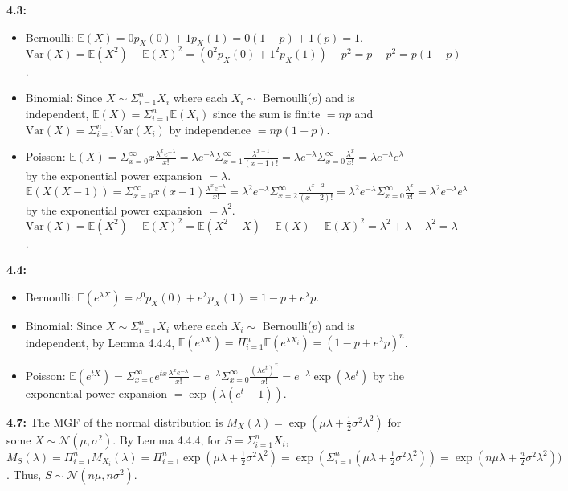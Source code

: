 \documentclass[12pt]{article}
\newcommand{\E}{\mathbb{E}}
\newcommand{\V}{\text{Var}}
\begin{document}
\textbf{4.3:}
\begin{itemize}
    \item Bernoulli: $\E(X) = 0p_X(0) + 1p_X(1) = 0(1 - p) + 1(p) = 1$. $\V(X) = \E(X^2) - \E(X)^2 = (0^2 p_X(0) + 1^2 p_X(1)) - p^2 = p - p^2 = p(1 - p)$.
    \item Binomial: Since $X \sim \Sigma_{i=1}^n X_i$ where each $X_i \sim$ Bernoulli($p$) and is independent, $\E(X) = \Sigma_{i=1}^n \E(X_i)$ since the sum is finite $= np$ and $\V(X) = \Sigma_{i=1}^n \V(X_i)$ by independence $= np(1 - p)$.
    \item Poisson: $\E(X) = \Sigma_{x=0}^\infty x\frac{\lambda^x e^{-\lambda}}{x!} = \lambda e^{-\lambda} \Sigma_{x=1}^\infty \frac{\lambda^{x-1}}{(x-1)!} = \lambda e^{-\lambda} \Sigma_{x=0}^\infty \frac{\lambda^x}{x!} = \lambda e^{-\lambda} e^{\lambda}$ by the exponential power expansion $= \lambda$. $\E(X(X-1)) = \Sigma_{x=0}^\infty x(x-1)\frac{\lambda^x e^{-\lambda}}{x!} = \lambda^2 e^{-\lambda} \Sigma_{x=2}^\infty \frac{\lambda^{x-2}}{(x-2)!} = \lambda^2 e^{-\lambda} \Sigma_{x=0}^\infty \frac{\lambda^x}{x!} = \lambda^2 e^{-\lambda} e^{\lambda}$ by the exponential power expansion $= \lambda^2$. $\V(X) = \E(X^2) - \E(X)^2 = \E(X^2 - X) + \E(X) - \E(X)^2 = \lambda^2 + \lambda - \lambda^2 = \lambda$.
\end{itemize}

\textbf{4.4:}
\begin{itemize}
    \item Bernoulli: $\E(e^{\lambda X}) = e^0 p_X(0) + e^\lambda p_X(1) = 1 - p + e^\lambda p$.
    \item Binomial: Since $X \sim \Sigma_{i=1}^n X_i$ where each $X_i \sim$ Bernoulli($p$) and is independent, by Lemma 4.4.4, $\E(e^{\lambda X}) = \Pi_{i=1}^n \E(e^{\lambda X_i}) = (1 - p + e^\lambda p)^n$.
    \item Poisson: $\E(e^{tX}) = \Sigma_{x=0}^\infty e^{tx} \frac{\lambda^x e^{-\lambda}}{x!} = e^{-\lambda} \Sigma_{x=0}^\infty \frac{(\lambda e^t)^x}{x!} = e^{-\lambda} \exp(\lambda e^t)$ by the exponential power expansion $= \exp(\lambda (e^t - 1))$.
\end{itemize}

\textbf{4.7:} The MGF of the normal distribution is $M_{X}(\lambda) = \exp(\mu\lambda + \frac{1}{2}\sigma^2\lambda^2)$ for some $X \sim \mathcal{N}(\mu, \sigma^2)$. By Lemma 4.4.4, for $S = \Sigma_{i=1}^n X_i$, $M_S(\lambda) = \Pi_{i=1}^n M_{X_i}(\lambda) = \Pi_{i=1}^n \exp(\mu\lambda + \frac{1}{2}\sigma^2\lambda^2) = \exp(\Sigma_{i=1}^n (\mu\lambda + \frac{1}{2}\sigma^2\lambda^2)) = \exp(n\mu\lambda + \frac{n}{2}\sigma^2\lambda^2))$. Thus, $S \sim \mathcal{N}(n\mu, n\sigma^2)$.
\end{document}

